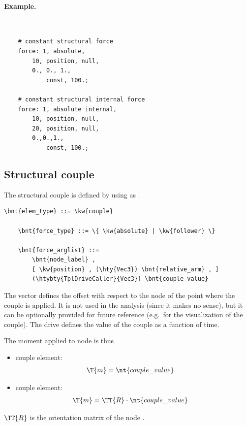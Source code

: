 \paragraph{Example.} \
\begin{verbatim}
    # constant structural force
    force: 1, absolute,
        10, position, null,
        0., 0., 1.,
            const, 100.;

    # constant structural internal force
    force: 1, absolute internal,
        10, position, null,
        20, position, null,
        0.,0.,1.,
            const, 100.;
\end{verbatim}


\subsection{Structural couple}
\label{sec:EL:FORCE:STRUCTURAL:COUPLE}
The structural couple is defined by using  as .
\begin{Verbatim}[commandchars=\\\{\}]
    \bnt{elem_type} ::= \kw{couple}

    \bnt{force_type} ::= \{ \kw{absolute} | \kw{follower} \} 

    \bnt{force_arglist} ::=
        \bnt{node_label} ,
        [ \kw{position} , (\hty{Vec3}) \bnt{relative_arm} , ]
        (\htybty{TplDriveCaller}{Vec3}) \bnt{couple_value}
\end{Verbatim}
The vector  defines the offset with respect
to the node of the point where the couple is applied.
It is not used in the analysis (since it makes no sense),
but it can be optionally provided for future reference
(e.g.\ for the visualization of the couple).
The drive  defines the value of the couple
as a function of time.

The moment applied to node  is thus
\begin{itemize}
\item {} couple element:
\begin{align}
	\T{m} & = \nt{couple\_value}
\end{align}

\item {} couple element:
\begin{align}
	\T{m} & = \TT{R} \cdot \nt{couple\_value}
\end{align}
\end{itemize}
$\TT{R}$ is the orientation matrix of the node .

